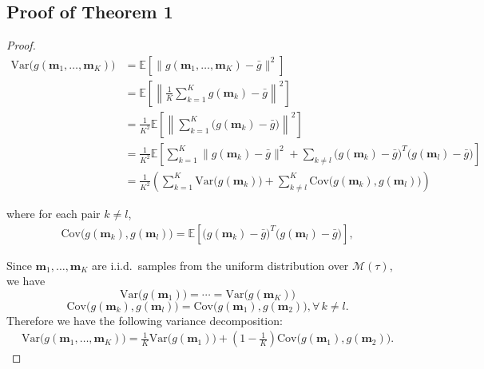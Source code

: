 \documentclass{article} \usepackage{iclr2021_conference,times}
\newcommand{\Var}{\mathrm{Var}}
\newcommand{\Cov}{\mathrm{Cov}}
\theoremstyle{plain}
\newcommand{\EE}{\mathbb{E}}
\begin{document}
\subsection{Proof of Theorem 1}
\label{appendix:1}
\begin{proof}
\begin{align}
	\Var\bigl(g(\mathbf{m}_1,\ldots,\mathbf{m}_K)\bigr) 
	&= \EE\left[\|g(\mathbf{m}_1,\ldots,\mathbf{m}_K)-\bar{g}\|^2\right] \nonumber \\
	&= \EE\left[\left\|\textstyle\frac{1}{K}\sum_{k=1}^K g(\mathbf{m}_k)-\bar{g}\right\|^2\right] \nonumber \\
	&= \frac{1}{K^2} \EE\left[\left\|\textstyle\sum_{k=1}^K\bigl(g(\mathbf{m}_k)-\bar{g}\bigr)\right\|^2\right] \nonumber \\
	&= \frac{1}{K^2} \EE\left[\sum_{k=1}^K\|g(\mathbf{m}_k)-\bar{g}\|^2 + \sum_{k\neq l}\bigl(g(\mathbf{m}_k) - \bar{g}\bigr)^T\bigl(g(\mathbf{m}_l) - \bar{g}\bigr)\right] \nonumber \\
	&= \frac{1}{K^2} \left(\sum_{k=1}^K \Var\bigl(g(\mathbf{m}_k)\bigr) + \sum_{k\neq l}^K \Cov\bigl(g(\mathbf{m}_k),g(\mathbf{m}_l)\bigr)\right)
	\label{eqn:mb-var-derivation} 
	\end{align}
	
	

where for each pair $k\neq l$, 
\begin{align}
\Cov\bigl(g(\mathbf{m}_k),g(\mathbf{m}_l)\bigr) 
= \EE\left[\bigl(g(\mathbf{m}_k) - \bar{g}\bigr)^T\bigl(g(\mathbf{m}_l) - \bar{g}\bigr)\right], \nonumber
\end{align}

Since $\mathbf{m}_1,\ldots,\mathbf{m}_K$ are i.i.d.\ samples from the uniform distribution over $\mathcal{M}(\tau)$, we have 
\begin{equation}\label{eqn:same-var}
\Var\bigl(g(\mathbf{m}_1)\bigr)=\cdots=\Var\bigl(g(\mathbf{m}_K)\bigr) 
\end{equation}
\begin{equation}\label{eqn:same-cov}
\Cov\bigl(g(\mathbf{m}_k),g(\mathbf{m}_l)\bigr) 
=\Cov\bigl(g(\mathbf{m}_1),g(\mathbf{m}_2)\bigr), \forall\,k\neq l. 
\end{equation}
Therefore we have the following variance decomposition:
\begin{align}
\label{var_decomp}
\Var\bigl(g(\mathbf{m}_1,\ldots,\mathbf{m}_K)\bigr) 
= \frac{1}{K} \Var\bigl(g(\mathbf{m}_1)\bigr) + \left(1-\frac{1}{K}\right)\Cov\bigl(g(\mathbf{m}_1),g(\mathbf{m}_2)\bigr). 
\end{align}
\end{proof}
\end{document}
